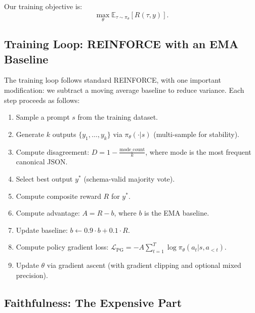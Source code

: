 \documentclass[11pt]{article}
\begin{document}
Our training objective is:
\begin{equation}
\max_{\theta} \mathbb{E}_{\tau \sim \pi_\theta} [R(\tau, y)].
\end{equation}

\subsection{Training Loop: REINFORCE with an EMA Baseline}

The training loop follows standard REINFORCE, with one important modification: we subtract a moving average baseline to reduce variance.
Each step proceeds as follows:
\begin{enumerate}[leftmargin=12pt]
    \item Sample a prompt $s$ from the training dataset.
    \item Generate $k$ outputs $\{y_1, \ldots, y_k\}$ via $\pi_\theta(\cdot | s)$ (multi-sample for stability).
    \item Compute disagreement: $D = 1 - \frac{\text{mode\_count}}{k}$, where mode is the most frequent canonical JSON.
    \item Select best output $y^*$ (schema-valid majority vote).
    \item Compute composite reward $R$ for $y^*$.
    \item Compute advantage: $A = R - b$, where $b$ is the EMA baseline.
    \item Update baseline: $b \leftarrow 0.9 \cdot b + 0.1 \cdot R$.
    \item Compute policy gradient loss: $\mathcal{L}_{\text{PG}} = -A \sum_{t=1}^{T} \log \pi_\theta(a_t | s, a_{<t})$.
    \item Update $\theta$ via gradient ascent (with gradient clipping and optional mixed precision).
\end{enumerate}


\subsection{Faithfulness: The Expensive Part}
\end{document}
